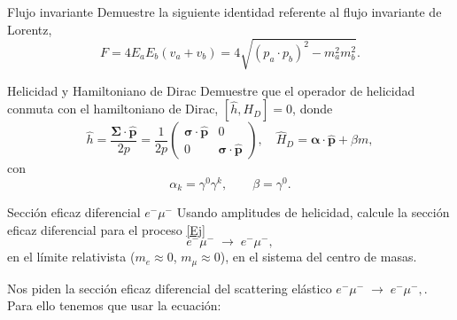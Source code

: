 

\begin{Ejercicio}{Flujo invariante}
	Demuestre la siguiente identidad referente al flujo invariante de Lorentz,
	\[
		F = 4E_aE_b(v_a+v_b) = 4\sqrt{(p_a\cdot p_b)^2 - m_a^2 m_b^2}.
	\]
\end{Ejercicio}



\begin{Ejercicio}{Helicidad y Hamiltoniano de Dirac}
	Demuestre que el operador de helicidad conmuta con el hamiltoniano de Dirac, $[\hat{h},H_D]=0$, donde
	\[
		\hat{h} = \frac{\symbf{\Sigma}\cdot \hat{\mathbf{p}}}{2p}
		= \frac{1}{2p}\begin{pmatrix} \symbf{\sigma}\cdot\hat{\mathbf{p}} & 0 \\ 0 & \symbf{\sigma}\cdot\hat{\mathbf{p}} \end{pmatrix},
		\quad
		\hat{H}_D = \symbf{\alpha}\cdot\hat{\mathbf{p}} + \beta m,
	\]
	con
	\[
		\alpha_k = \gamma^0 \gamma^k, \qquad \beta = \gamma^0.
	\]
\end{Ejercicio}




\begin{Ejercicio}{Sección eficaz diferencial $e^-\mu^-$}\label{Ej:6}
	Usando amplitudes de helicidad, calcule la sección eficaz diferencial para el proceso \ref{Ej}
	\[
		e^- \mu^- \;\to\; e^- \mu^-,
	\]
	en el límite relativista ($m_e \approx 0$, $m_\mu \approx 0$), en el sistema del centro de masas.
\end{Ejercicio}

Nos piden la sección eficaz diferencial del scattering elástico $e^- \mu^- \;\to\; e^- \mu^-,$. Para ello tenemos que usar la ecuación:

